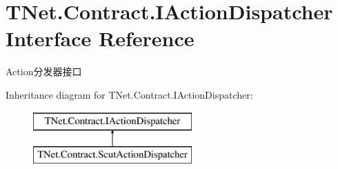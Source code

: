 \hypertarget{interface_t_net_1_1_contract_1_1_i_action_dispatcher}{}\section{T\+Net.\+Contract.\+I\+Action\+Dispatcher Interface Reference}
\label{interface_t_net_1_1_contract_1_1_i_action_dispatcher}


Action分发器接口  


Inheritance diagram for T\+Net.\+Contract.\+I\+Action\+Dispatcher\+:\begin{figure}[H]
\begin{center}
\leavevmode
\includegraphics[height=2.000000cm]{interface_t_net_1_1_contract_1_1_i_action_dispatcher}
\end{center}
\end{figure}
